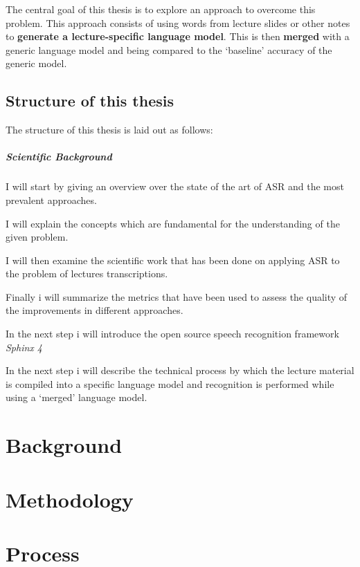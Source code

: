 The central goal of this thesis is to explore an approach to overcome
this problem. This approach consists of using words from lecture slides
or other notes to \textbf{generate a lecture-specific language model}.
This is then \textbf{merged} with a generic language model and being
compared to the `baseline' accuracy of the generic model.

\subsection{Structure of this thesis}\label{structure-of-this-thesis}

The structure of this thesis is laid out as follows:

\subparagraph*{Scientific Background}\label{scientific-background}

I will start by giving an overview over the state of the art of ASR and
the most prevalent approaches.

I will explain the concepts which are fundamental for the understanding
of the given problem.

I will then examine the scientific work that has been done on applying
ASR to the problem of lectures transcriptions.

Finally i will summarize the metrics that have been used to assess the
quality of the improvements in different approaches.

\begin{description}
\tightlist
\item[Technical process]
In the next step i will introduce the open source speech recognition
framework \emph{Sphinx 4}

In the next step i will describe the technical process by which the
lecture material is compiled into a specific language model and
recognition is performed while using a `merged' language model.
\end{description}

\section{Background}\label{background}

\section{Methodology}\label{methodology}

\section{Process}\label{process}

